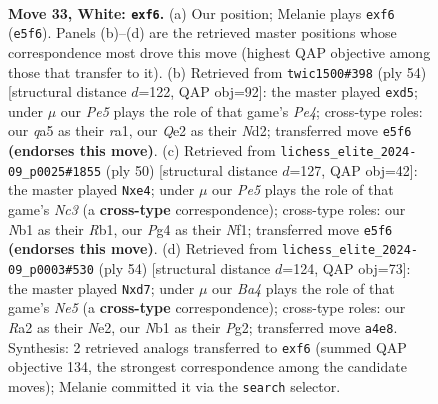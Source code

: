 \documentclass[11pt]{article}
\begin{document}
\begin{figure}[p]\centering
\begin{subfigure}{0.46\textwidth}\centering
\resizebox{\linewidth}{!}{%
\newchessgame
\chessboard[
  setfen={r1b2r2/pp3pbk/n4np1/q2pP1Bp/B5PP/1P6/R1PNQP2/1N2R1K1 w - - 0 33},
  showmover=false,
  pgfstyle=straightmove, color=movearrow, markmove={e5-f6}
]}
\caption{}
\end{subfigure}\hfill
\begin{subfigure}{0.46\textwidth}\centering
\resizebox{\linewidth}{!}{%
\newchessgame
\chessboard[
  setfen={5bk1/5pp1/q1np3p/2nbp3/1pP1P3/4B2P/1P1NQPP1/rB1R2K1 w - - 0 28},
  showmover=false,
  pgfstyle=straightmove, color=movearrow, markmove={e4-d5}
]}
\caption{}
\end{subfigure}
\\[4pt]
\begin{subfigure}{0.46\textwidth}\centering
\resizebox{\linewidth}{!}{%
\newchessgame
\chessboard[
  setfen={2r1kb1r/1p3pp1/p1bp3p/4pP2/P3n2q/1RN1BQ1P/6P1/1R3NK1 w k - 0 26},
  showmover=false,
  pgfstyle=straightmove, color=movearrow, markmove={c3-e4}
]}
\caption{}
\end{subfigure}\hfill
\begin{subfigure}{0.46\textwidth}\centering
\resizebox{\linewidth}{!}{%
\newchessgame
\chessboard[
  setfen={3rr1k1/1pqn2p1/4pb1p/2n1Np1P/p1PB4/1P2QP1R/P3N1P1/4RK2 w - - 2 28},
  showmover=false,
  pgfstyle=straightmove, color=movearrow, markmove={e5-d7}
]}
\caption{}
\end{subfigure}
\caption{\textbf{Move 33, White: \texttt{exf6}.} (a) Our position; Melanie plays \texttt{exf6} (\texttt{e5f6}). Panels (b)--(d) are the retrieved master positions whose correspondence most drove this move (highest QAP objective among those that transfer to it). (b) Retrieved from \texttt{twic1500\#398} (ply 54) [structural distance $d$=122, QAP obj=92]: the master played \texttt{exd5}; under $\mu$ our \emph{Pe5} plays the role of that game's \emph{Pe4}; cross-type roles: our \emph{q}a5 as their \emph{r}a1, our \emph{Q}e2 as their \emph{N}d2; transferred move \texttt{e5f6} \textbf{(endorses this move)}. (c) Retrieved from \texttt{lichess\_elite\_2024-09\_p0025\#1855} (ply 50) [structural distance $d$=127, QAP obj=42]: the master played \texttt{Nxe4}; under $\mu$ our \emph{Pe5} plays the role of that game's \emph{Nc3} (a \textbf{cross-type} correspondence); cross-type roles: our \emph{N}b1 as their \emph{R}b1, our \emph{P}g4 as their \emph{N}f1; transferred move \texttt{e5f6} \textbf{(endorses this move)}. (d) Retrieved from \texttt{lichess\_elite\_2024-09\_p0003\#530} (ply 54) [structural distance $d$=124, QAP obj=73]: the master played \texttt{Nxd7}; under $\mu$ our \emph{Ba4} plays the role of that game's \emph{Ne5} (a \textbf{cross-type} correspondence); cross-type roles: our \emph{R}a2 as their \emph{N}e2, our \emph{N}b1 as their \emph{P}g2; transferred move \texttt{a4e8}. Synthesis: 2 retrieved analogs transferred to \texttt{exf6} (summed QAP objective 134, the strongest correspondence among the candidate moves); Melanie committed it via the \texttt{search} selector.}
\label{fig:thought-m64}
\end{figure}
\end{document}
